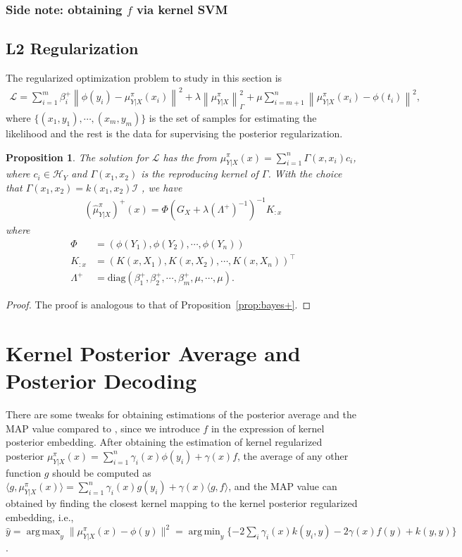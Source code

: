 \documentclass[a4paper]{article}
\newcommand{\up}{\mathrm}
\renewcommand{\cal}{\mathcal}
\newcommand{\norm}[1]{\left\lVert#1\right\rVert}
\newcommand{\T}{\intercal}
\DeclareMathOperator*{\argmin}{arg\,min}
\DeclareMathOperator*{\argmax}{arg\,max}
\newtheorem{proposition}{Proposition}
\newcommand{\propref}[1]{Proposition~\ref{#1}}
\def\muyxplus{(\widehat{\mu}_{Y|X}^\pi)^+}
\begin{document}
\subsubsection{Side note: obtaining $f$ via kernel SVM}


\subsection{L2 Regularization}
The regularized optimization problem to study in this section is
\begin{align}
\cal{L} = \sum_{i=1}^{m} \beta_i^+ \norm{\phi(y_i) - \mu_{Y|X}^\pi(x_i)}^2 + \lambda\norm{\mu_{Y|X}^\pi}_\Gamma^2 + \mu \sum_{i=m+1}^{n} \norm{\mu_{Y|X}^\pi(x_i) - \phi(t_i)}^2,
\end{align}
where $\{(x_1,y_1),\cdots,(x_m,y_m)\}$ is the set of samples for estimating the likelihood and the rest is the data for supervising the posterior regularization.
\begin{proposition}
The solution for $\cal{L}$ has the from $\mu_{Y|X}^\pi(x) = \sum_{i=1}^{n} \Gamma(x,x_i)c_i$, where $c_i \in \cal{H}_Y$ and $\Gamma(x_1,x_2)$ is the reproducing kernel of $\Gamma$. With the choice that $\Gamma(x_1,x_2) = k(x_1,x_2)\cal{I}$ , we have
\begin{align}
\muyxplus(x) = \Phi(G_X + \lambda(\Lambda^+)^{-1})^{-1}K_{:x}\label{eqn:l2reg}
\end{align}
where
\begin{align*}
\Phi &= (\phi(Y_1),\phi(Y_2),\cdots,\phi(Y_{n}))\\
K_{:x} &= (K(x,X_1),K(x,X_2),\cdots,K(x,X_{n}))^\T\\
\Lambda^+ &= \up{diag}(\beta_1^+,\beta_2^+,\cdots,\beta_m^+,\mu,\cdots,\mu).
\end{align*}
\end{proposition}
\begin{proof}
The proof is analogous to that of \propref{prop:bayes+}.
\end{proof}
\section{Kernel Posterior Average and Posterior Decoding}
There are some tweaks for obtaining estimations of the posterior average and the MAP value compared to \cite{song2013kernel}, since we introduce $f$ in the expression of kernel posterior embedding. After obtaining the estimation of kernel regularized posterior $\mu_{Y|X}^\pi(x) = \sum_{i=1}^n \gamma_i(x) \phi(y_i) + \gamma(x) f$, the average of any other function $g$ should be computed as $\langle g, \mu_{Y|X}^\pi(x)\rangle = \sum_{i=1}^{n} \gamma_i(x)g(y_i) + \gamma(x) \langle g,f\rangle$, and the MAP value can obtained by finding the closest kernel mapping to the kernel posterior regularized embedding, i.e., $\hat{y} = \argmax_{y} \|\mu_{Y|X}^\pi(x) - \phi(y)\|^2 = \argmin_{y} \{ %
- 2\sum_i\gamma_i(x)k(y_i,y) - 2\gamma(x)f(y) + k(y,y)\}$. 
\end{document}
